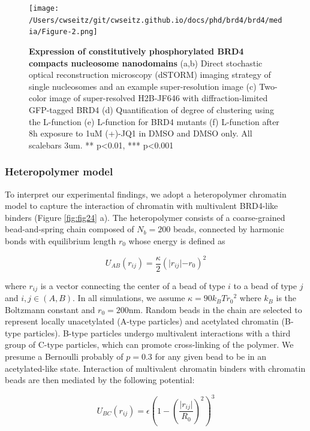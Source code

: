 \begin{figure}[t]
\texttt{[image: /Users/cwseitz/git/cwseitz.github.io/docs/phd/brd4/brd4/media/Figure-2.png]}
\caption{\textbf{Expression of constitutively phosphorylated BRD4 compacts nucleosome nanodomains} (a,b) Direct stochastic optical reconstruction microscopy (dSTORM) imaging strategy of single nucleosomes and an example super-resolution image (c) Two-color image of super-resolved H2B-JF646 with diffraction-limited GFP-tagged BRD4 (d) Quantification of degree of clustering using the L-function (e) L-function for BRD4 mutants (f) L-function after 8h exposure to 1uM (+)-JQ1 in DMSO and DMSO only. All scalebars 3um. ** p<0.01, *** p<0.001}
\label{fig:fig25}
\end{figure}

\subsubsection{Heteropolymer model}

To interpret our experimental findings, we adopt a heteropolymer chromatin model to capture the interaction of chromatin with multivalent BRD4-like binders (Figure \ref{fig:fig24} a). The heteropolymer consists of a coarse-grained bead-and-spring chain composed of $N_b=200$ beads, connected by harmonic bonds with equilibrium length $r_0$ whose energy is deﬁned as

\begin{equation}
U_{AB}(r_{ij})=\frac{\kappa}{2}(\lvert r_{ij}\lvert-r_0)^2
\end{equation}

where $r_{ij}$ is a vector connecting the center of a bead of type $i$ to a bead of type $j$ and $i,j \in (A,B)$. In all simulations, we assume $\kappa=90k_{B}T{r_0}^2$ where $k_{B}$ is the Boltzmann constant and $r_0=200$nm. Random beads in the chain are selected to represent locally unacetylated (A-type particles) and acetylated chromatin (B-type particles).  B-type particles undergo multivalent interactions with a third group of C-type particles, which can promote cross-linking of the polymer. We presume a Bernoulli probably of $p=0.3$ for any given bead to be in an acetylated-like state. Interaction of multivalent chromatin binders with chromatin beads are then mediated by the following potential:

\begin{equation}
U_{BC}\left(r_{ij}\right)=\epsilon\left(1-\left(\frac{\lvert r_{ij}\lvert}{R_0}\right)^2\right)^3
\end{equation}

